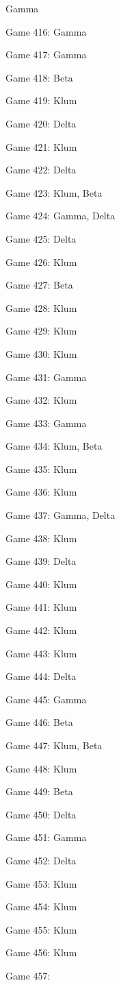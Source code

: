 \documentclass{article}
\begin{document}
\begin{multicols}{3}
\begin{compactitem}
Gamma
\item Game 416:
Gamma
\item Game 417:
Gamma
\item Game 418:
Beta
\item Game 419:
Klum
\item Game 420:
Delta
\item Game 421:
Klum
\item Game 422:
Delta
\item Game 423:
Klum, Beta
\item Game 424:
Gamma, Delta
\item Game 425:
Delta
\item Game 426:
Klum
\item Game 427:
Beta
\item Game 428:
Klum
\item Game 429:
Klum
\item Game 430:
Klum
\item Game 431:
Gamma
\item Game 432:
Klum
\item Game 433:
Gamma
\item Game 434:
Klum, Beta
\item Game 435:
Klum
\item Game 436:
Klum
\item Game 437:
Gamma, Delta
\item Game 438:
Klum
\item Game 439:
Delta
\item Game 440:
Klum
\item Game 441:
Klum
\item Game 442:
Klum
\item Game 443:
Klum
\item Game 444:
Delta
\item Game 445:
Gamma
\item Game 446:
Beta
\item Game 447:
Klum, Beta
\item Game 448:
Klum
\item Game 449:
Beta
\item Game 450:
Delta
\item Game 451:
Gamma
\item Game 452:
Delta
\item Game 453:
Klum
\item Game 454:
Klum
\item Game 455:
Klum
\item Game 456:
Klum
\item Game 457:

\end{compactitem}
\end{multicols}
\end{document}
